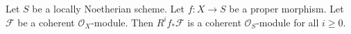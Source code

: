 %
\begin{proposition}
\label{proposition-proper-pushforward-coherent}
\begin{reference}
\cite[III Theorem 3.2.1]{EGA}
\end{reference}
Let $S$ be a locally Noetherian scheme.
Let $f : X \to S$ be a proper morphism.
Let $\mathcal{F}$ be a coherent $\mathcal{O}_X$-module.
Then $R^if_*\mathcal{F}$ is a coherent $\mathcal{O}_S$-module
for all $i \geq 0$.
\end{proposition}

